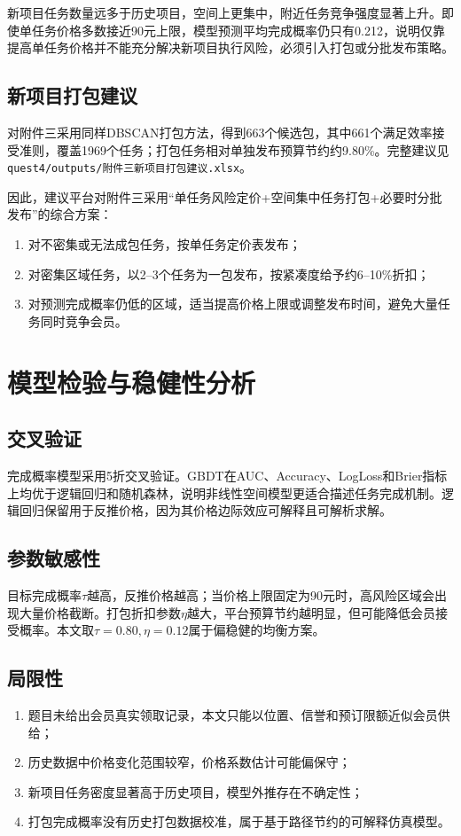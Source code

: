 \documentclass[UTF8,a4paper,12pt]{ctexart}
\begin{document}
新项目任务数量远多于历史项目，空间上更集中，附近任务竞争强度显著上升。即使单任务价格多数接近90元上限，模型预测平均完成概率仍只有0.212，说明仅靠提高单任务价格并不能充分解决新项目执行风险，必须引入打包或分批发布策略。

\subsection{新项目打包建议}
对附件三采用同样DBSCAN打包方法，得到663个候选包，其中661个满足效率接受准则，覆盖1969个任务；打包任务相对单独发布预算节约约9.80\%。完整建议见\texttt{quest4/outputs/附件三新项目打包建议.xlsx}。

因此，建议平台对附件三采用``单任务风险定价+空间集中任务打包+必要时分批发布''的综合方案：
\begin{enumerate}[label=\arabic*)]
\item 对不密集或无法成包任务，按单任务定价表发布；
\item 对密集区域任务，以2--3个任务为一包发布，按紧凑度给予约6--10\%折扣；
\item 对预测完成概率仍低的区域，适当提高价格上限或调整发布时间，避免大量任务同时竞争会员。
\end{enumerate}

\section{模型检验与稳健性分析}
\subsection{交叉验证}
完成概率模型采用5折交叉验证。GBDT在AUC、Accuracy、LogLoss和Brier指标上均优于逻辑回归和随机森林，说明非线性空间模型更适合描述任务完成机制。逻辑回归保留用于反推价格，因为其价格边际效应可解释且可解析求解。

\subsection{参数敏感性}
目标完成概率$\tau$越高，反推价格越高；当价格上限固定为90元时，高风险区域会出现大量价格截断。打包折扣参数$\eta$越大，平台预算节约越明显，但可能降低会员接受概率。本文取$\tau=0.80,\eta=0.12$属于偏稳健的均衡方案。

\subsection{局限性}
\begin{enumerate}[label=\arabic*)]
\item 题目未给出会员真实领取记录，本文只能以位置、信誉和预订限额近似会员供给；
\item 历史数据中价格变化范围较窄，价格系数估计可能偏保守；
\item 新项目任务密度显著高于历史项目，模型外推存在不确定性；
\item 打包完成概率没有历史打包数据校准，属于基于路径节约的可解释仿真模型。
\end{enumerate}
\end{document}

